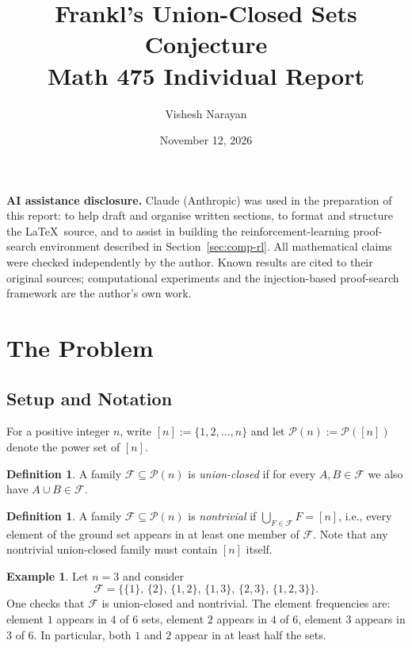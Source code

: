 \documentclass[11pt]{article}
\title{Frankl's Union-Closed Sets Conjecture\\[0.4em]
\large Math 475 Individual Report}
\author{Vishesh Narayan}
\date{November 12, 2026}
\theoremstyle{definition}
\newtheorem{definition}[theorem]{Definition}
\newtheorem{example}[theorem]{Example}
\theoremstyle{remark}
\newcommand{\F}{\mathcal{F}}
\newcommand{\Pow}{\mathcal{P}}
\begin{document}
\maketitle

\begin{small}
\noindent\textbf{AI assistance disclosure.}
Claude (Anthropic) was used in the preparation of this report:
to help draft and organise written sections, to format and structure the \LaTeX\ source,
and to assist in building the reinforcement-learning proof-search environment
described in Section~\ref{sec:comp-rl}.
All mathematical claims were checked independently by the author.
Known results are cited to their original sources; computational experiments
and the injection-based proof-search framework are the author's own work.
\end{small}

\tableofcontents
\newpage

\section{The Problem}

\subsection{Setup and Notation}

For a positive integer $n$, write $[n] := \{1, 2, \ldots, n\}$ and let
$\Pow(n) := \Pow([n])$ denote the power set of $[n]$.

\begin{definition}
A family $\F \subseteq \Pow(n)$ is \emph{union-closed} if for every
$A, B \in \F$ we also have $A \cup B \in \F$.
\end{definition}

\begin{definition}
A family $\F \subseteq \Pow(n)$ is \emph{nontrivial} if
$\bigcup_{F \in \F} F = [n]$, i.e., every element of the ground set
appears in at least one member of $\F$.
Note that any nontrivial union-closed family must contain $[n]$ itself.
\end{definition}

\begin{example}
Let $n = 3$ and consider
\[
  \F = \bigl\{\{1\},\, \{2\},\, \{1,2\},\, \{1,3\},\, \{2,3\},\,
              \{1,2,3\}\bigr\}.
\]
One checks that $\F$ is union-closed and nontrivial.
The element frequencies are: element $1$ appears in $4$ of $6$ sets,
element $2$ appears in $4$ of $6$, element $3$ appears in $3$ of $6$.
In particular, both $1$ and $2$ appear in at least half the sets.
\end{example}
\end{document}
